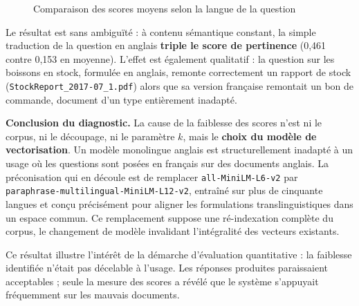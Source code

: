 \begin{figure}[htbp]
\centering
{}
\caption{Comparaison des scores moyens selon la langue de la question}
\label{fig:langue-scores}
\end{figure}

Le résultat est sans ambiguïté : à contenu sémantique constant, la simple
traduction de la question en anglais \textbf{triple le score de pertinence}
(0,461 contre 0,153 en moyenne). L'effet est également qualitatif : la question
sur les boissons en stock, formulée en anglais, remonte correctement un rapport
de stock (\texttt{StockReport\_2017-07\_1.pdf}) alors que sa version française
remontait un bon de commande, document d'un type entièrement inadapté.

\begin{encadre}
\textbf{Conclusion du diagnostic.} La cause de la faiblesse des scores n'est ni
le corpus, ni le découpage, ni le paramètre $k$, mais le \textbf{choix du modèle
de vectorisation}. Un modèle monolingue anglais est structurellement inadapté à
un usage où les questions sont posées en français sur des documents anglais.
La préconisation qui en découle est de remplacer
\texttt{all-MiniLM-L6-v2} par \texttt{paraphrase-multilingual-MiniLM-L12-v2},
entraîné sur plus de cinquante langues et conçu précisément pour aligner les
formulations translinguistiques dans un espace commun. Ce remplacement suppose
une ré-indexation complète du corpus, le changement de modèle invalidant
l'intégralité des vecteurs existants.
\end{encadre}

Ce résultat illustre l'intérêt de la démarche d'évaluation quantitative : la
faiblesse identifiée n'était pas décelable à l'usage. Les réponses produites
paraissaient acceptables ; seule la mesure des scores a révélé que le système
s'appuyait fréquemment sur les mauvais documents.

